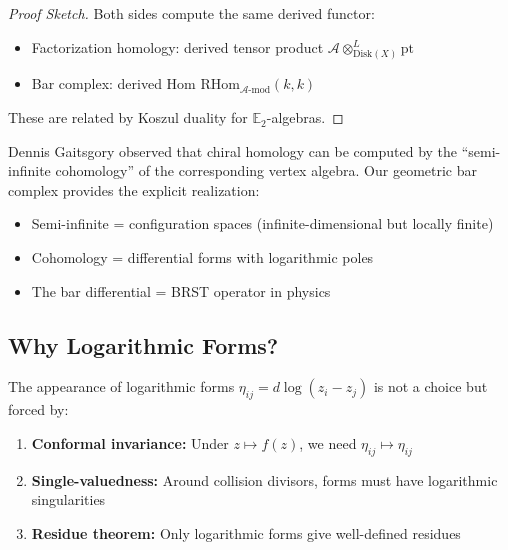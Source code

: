 \begin{proof}[Proof Sketch]
Both sides compute the same derived functor:
\begin{itemize}
\item Factorization homology: derived tensor product $\mathcal{A} \otimes^L_{\text{Disk}(X)} \text{pt}$
\item Bar complex: derived Hom $\text{RHom}_{\mathcal{A}\text{-mod}}(k, k)$
\end{itemize}
These are related by Koszul duality for $\mathbb{E}_2$-algebras.
\end{proof}

\begin{remark}
Dennis Gaitsgory observed that chiral homology can be computed by the ``semi-infinite cohomology'' 
of the corresponding vertex algebra. Our geometric bar complex provides the explicit realization:
\begin{itemize}
\item Semi-infinite = configuration spaces (infinite-dimensional but locally finite)
\item Cohomology = differential forms with logarithmic poles
\item The bar differential = BRST operator in physics
\end{itemize}
\end{remark}

\subsection{Why Logarithmic Forms?}

\begin{proposition}
The appearance of logarithmic forms $\eta_{ij} = d\log(z_i - z_j)$ is not a choice but forced by:
\begin{enumerate}
\item \textbf{Conformal invariance:} Under $z \mapsto f(z)$, we need $\eta_{ij} \mapsto \eta_{ij}$
\item \textbf{Single-valuedness:} Around collision divisors, forms must have logarithmic singularities
\item \textbf{Residue theorem:} Only logarithmic forms give well-defined residues
\end{enumerate}
\end{proposition}

